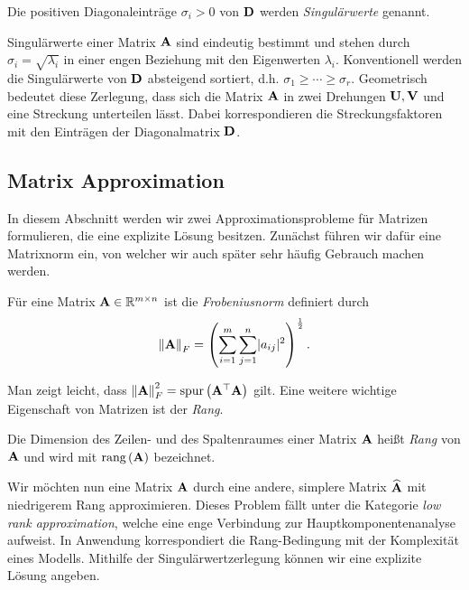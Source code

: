 \begin{defn}[Singulärwert]
Die positiven Diagonaleinträge $\sigma_{i} > 0$ von $\mathbf{D}$ werden \textit{Singulärwerte} genannt.
\end{defn}

Singulärwerte einer Matrix $\mathbf{A}$ sind eindeutig bestimmt und stehen durch $\sigma_i = \sqrt{\lambda_i}$ in einer engen Beziehung mit den Eigenwerten $\lambda_i$. Konventionell werden die Singulärwerte von $\mathbf{D}$ absteigend sortiert, d.h. $\sigma _{1} \geq \cdots \geq \sigma _{r}$. Geometrisch bedeutet diese Zerlegung, dass sich die Matrix $\mathbf{A}$ in zwei Drehungen $\mathbf{U}, \mathbf{V}$ und eine Streckung unterteilen lässt. Dabei korrespondieren die Streckungsfaktoren mit den Einträgen der Diagonalmatrix $\mathbf{D}$.


\subsection{Matrix Approximation}

In diesem Abschnitt werden wir zwei Approximationsprobleme für Matrizen formulieren, die eine explizite Lösung besitzen. Zunächst führen wir dafür eine Matrixnorm ein, von welcher wir auch später sehr häufig Gebrauch machen werden.

\begin{defn}
Für eine Matrix $\mathbf{A} \in \mathbb{R}^{m \times n}$ ist die \textit{Frobeniusnorm} definiert durch
$$\left\lVert \mathbf{A} \right\rVert_F = \left( \sum_{i=1}^{m} \sum_{j=1}^{n} \lvert a_{ij} \rvert ^{2} \right) ^{\frac{1}{2}}.$$
\end{defn}

Man zeigt leicht, dass $\left\lVert \mathbf{A} \right\rVert_F^2 = \text{spur} \left( \mathbf{A}^{\top} \mathbf{A} \right)$ gilt.
Eine weitere wichtige Eigenschaft von Matrizen ist der \textit{Rang}.

\begin{defn}
Die Dimension des Zeilen- und des Spaltenraumes einer Matrix $\mathbf{A}$ heißt \textit{Rang} von $\mathbf{A}$ und wird mit $\text{rang} \left( \mathbf{A} \right)$ bezeichnet.
\end{defn}

Wir möchten nun eine Matrix $\mathbf{A}$ durch eine andere, simplere Matrix $\widehat{\mathbf{A}}$ mit niedrigerem Rang approximieren. Dieses Problem fällt unter die Kategorie \textit{low rank approximation}, welche eine enge Verbindung zur Hauptkomponentenanalyse aufweist. In Anwendung korrespondiert die Rang-Bedingung mit der Komplexität eines Modells. Mithilfe der Singulärwertzerlegung können wir eine explizite Lösung angeben.

